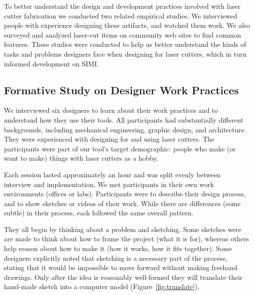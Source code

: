 \documentclass{article}
\begin{document}
To better understand the design and development practices involved
with laser cutter fabrication we conducted two related empirical
studies. We interviewed people with experience designing these
artifacts, and watched them work. We also surveyed and analyzed
laser-cut items on community web sites to find common features. These
studies were conducted to help us better understand the kinds of tasks
and problems designers face when designing for laser cutters, which in
turn informed development on SIMI.

\subsection{Formative Study on Designer Work Practices}
\label{sec:formative}

We interviewed six designers to learn about their work practices and
to understand how they use their tools. All participants had
substantially different backgrounds, including mechanical engineering,
graphic design, and architecture.  They were experienced with
designing for and using laser cutters. The participants were part of
our tool's target demographic: people who make (or want to make)
things with laser cutters as a hobby.

Each session lasted approximately an hour and was split evenly between
interview and implementation. We met participants in their own work
environments (offices or labs). Participants were to describe their
design process, and to show sketches or videos of their work. While
there are differences (some subtle) in their process, each followed
the same overall pattern.

They all begin by thinking about a problem and sketching. Some
sketches were are made to think about how to frame the project (what
it is for), whereas others help reason about how to make it (how it
works, how it fits together). Some designers explicitly noted that
sketching is a necessary part of the process, stating that it would be
impossible to move forward without making freehand drawings. Only
after the idea is reasonably well-formed they will translate their
hand-made sketch into a computer model (Figure~\ref{fig:translate}).
\end{document}
